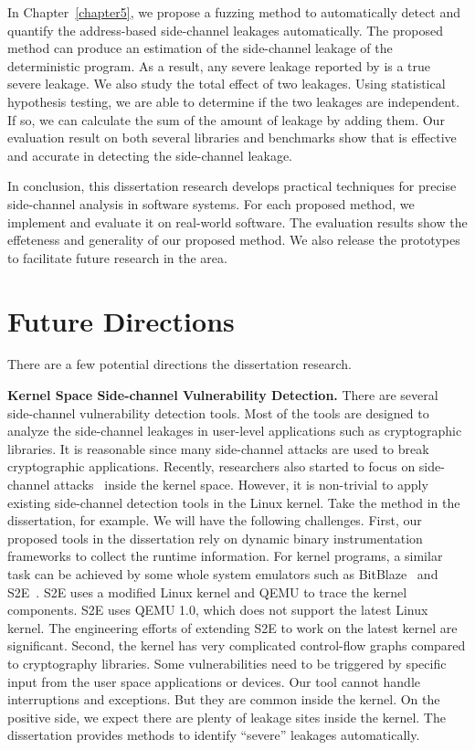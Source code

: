 In Chapter~\ref{chapter5}, we propose a fuzzing method to automatically detect and quantify the address-based side-channel leakages automatically. The proposed method can produce an estimation of the side-channel leakage of the deterministic program. As a result, any severe leakage reported by \ctool{} is a true severe leakage. We also study the total effect of two leakages. Using statistical hypothesis testing, we are able to determine if the two leakages are independent. If so, we can calculate the sum of the amount of leakage by adding them. Our evaluation result on both several libraries and benchmarks show that \ctool{} is effective and accurate in detecting the side-channel leakage.

In conclusion, this dissertation research develops practical techniques for precise side-channel analysis in software systems. For each proposed method, we implement and evaluate it on real-world software. The evaluation results show the effeteness and generality of our proposed method.  We also release the prototypes to facilitate future research in the area.
\section{Future Directions}
There are a few potential directions the dissertation research. 

\textbf{Kernel Space Side-channel Vulnerability Detection.} There are several side-channel vulnerability detection tools. Most of the tools are designed to analyze the side-channel leakages in user-level applications such as cryptographic libraries. It is reasonable since many side-channel attacks are used to break cryptographic applications. Recently, researchers also started to focus on side-channel attacks~\cite{cao2016off} inside the kernel space. However, it is non-trivial to apply existing side-channel detection tools in the Linux kernel. Take the method in the dissertation, for example. We will have the following challenges. First, our proposed tools in the dissertation rely on dynamic binary instrumentation frameworks to collect the runtime information. For kernel programs, a similar task can be achieved by some whole system emulators such as BitBlaze~\cite{song2008bitblaze} and S2E~\cite{chipounov2012s2e}. S2E uses a modified Linux kernel and QEMU to trace the kernel components. S2E uses QEMU 1.0, which does not support the latest Linux kernel. The engineering efforts of extending S2E to work on the latest kernel are significant. Second, the kernel has very complicated control-flow graphs compared to cryptography libraries. Some vulnerabilities need to be triggered by specific input from the user space applications or devices. Our tool cannot handle interruptions and exceptions. But they are common inside the kernel. On the positive side, we expect there are plenty of leakage sites inside the kernel. The dissertation provides methods to identify ``severe'' leakages automatically.


